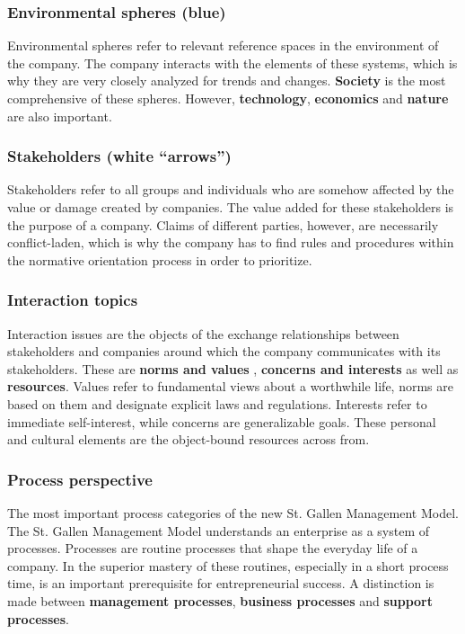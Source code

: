 \subsubsection{Environmental spheres (blue)}
Environmental spheres refer to relevant reference spaces in the environment of the company. The company interacts with the elements of these systems, which is why they are very closely analyzed for trends and changes. \textbf{Society} is the most comprehensive of these spheres. However, \textbf{technology}, \textbf{economics} and \textbf{nature} are also important.

\subsubsection{Stakeholders (white ``arrows'')}
Stakeholders refer to all groups and individuals who are somehow affected by the value or damage created by companies. The value added for these stakeholders is the purpose of a company. Claims of different parties, however, are necessarily conflict-laden, which is why the company has to find rules and procedures within the normative orientation process in order to prioritize.

\subsubsection{Interaction topics}
Interaction issues are the objects of the exchange relationships between stakeholders and companies around which the company communicates with its stakeholders. These are \textbf{norms and values} , \textbf{concerns and interests} as well as \textbf{resources}. Values refer to fundamental views about a worthwhile life, norms are based on them and designate explicit laws and regulations. Interests refer to immediate self-interest, while concerns are generalizable goals. These personal and cultural elements are the object-bound resources across from.

\subsubsection{Process perspective}
The most important process categories of the new St. Gallen Management Model. The St. Gallen Management Model understands an enterprise as a system of processes. Processes are routine processes that shape the everyday life of a company. In the superior mastery of these routines, especially in a short process time, is an important prerequisite for entrepreneurial success. A distinction is made between \textbf{management processes}, \textbf{business processes} and \textbf{support processes}.

